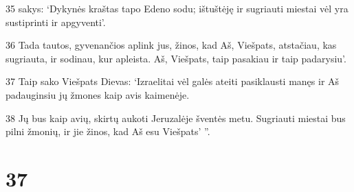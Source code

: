 \par 35 sakys: ‘Dykynės kraštas tapo Edeno sodu; ištuštėję ir sugriauti miestai vėl yra sustiprinti ir apgyventi’. 
\par 36 Tada tautos, gyvenančios aplink jus, žinos, kad Aš, Viešpats, atstačiau, kas sugriauta, ir sodinau, kur apleista. Aš, Viešpats, taip pasakiau ir taip padarysiu’. 
\par 37 Taip sako Viešpats Dievas: ‘Izraelitai vėl galės ateiti pasiklausti manęs ir Aš padauginsiu jų žmones kaip avis kaimenėje. 
\par 38 Jų bus kaip avių, skirtų aukoti Jeruzalėje šventės metu. Sugriauti miestai bus pilni žmonių, ir jie žinos, kad Aš esu Viešpats’ ”.



\chapter{37}


